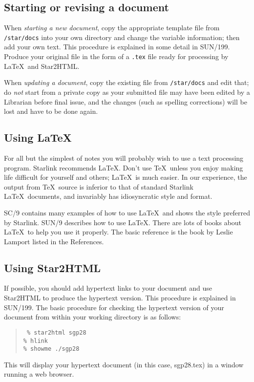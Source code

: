 \documentclass[twoside,11pt]{article}
\newcommand{\xref}[3]{#1}
\begin{document}
\subsection{Starting or revising a document}

When {\em starting a new document}, copy the appropriate template file from
{\tt /star/docs}
into your own directory and change the variable information; then add your
own text.
This procedure is explained in some detail in
\xref{SUN/199}{sun199}{}.
Produce your original file in the form of a {\tt .tex} file ready for
processing by \LaTeX\ and Star2HTML.

When {\em updating a document}, copy the existing file from {\tt /star/docs}
and edit that; do {\em not} start from a private copy as your submitted file
may have been edited by a Librarian before final issue, and the
changes (such as spelling corrections) will be lost and have to be done again.

\subsection{Using \LaTeX}

For all but the simplest of notes you will probably wish to use a text
processing program.
Starlink recommends {\LaTeX}.
Don't use \TeX\ unless you enjoy making life difficult for yourself and
others; \LaTeX\ is much easier.
In our experience, the output from \TeX\ source is inferior to that of
standard Starlink \LaTeX\ documents, and invariably has idiosyncratic style and
format.

\xref{SC/9}{sc9}{}
contains many examples of how to use \LaTeX\ and shows the style preferred by
Starlink.
\xref{SUN/9}{sun9}{} describes how to use \LaTeX.
There are lots of books about \LaTeX\ to help you use it properly.
The basic reference is the book by Leslie Lamport listed in the References.

\subsection{Using Star2HTML}

If possible, you should add hypertext links to your document and use
Star2HTML to produce the hypertext version.
This procedure is explained in \xref{SUN/199}{sun199}{}.
The basic procedure for checking the hypertext version of your document
from within your working directory is as follows:
\begin{quote}
{\tt
\% star2html sgp28\\
\% hlink\\
\% showme ./sgp28}
\end{quote}
This will display your hypertext document (in this case, sgp28.tex) in a window
running a web browser.
\end{document}
